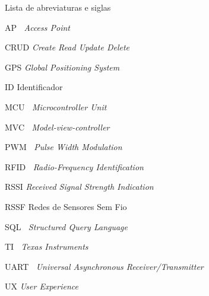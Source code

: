 \documentclass[]{politex}
\begin{document}
\capa
\falsafolhaderosto
\folhaderosto


\begin{folhadeaprovacao}
\end{folhadeaprovacao}














\listadefiguras
\listadetabelas

\begin{pretextualsection}{Lista de abreviaturas e siglas}

AP \quad \quad $\>$ \textit{Access Point}

CRUD \quad \textit{Create Read Update Delete}

GPS \quad \quad \textit{Global Positioning System}

ID \quad \quad \quad Identificador

MCU \quad $\>$ \textit{Microcontroller Unit}

MVC \quad $\>$ \textit{Model-view-controller}

PWM \quad $\>$ \textit{Pulse Width Modulation}

RFID \quad $\>$ \textit{Radio-Frequency Identification}

RSSI \quad \quad \textit{Received Signal Strength Indication}

RSSF \quad \quad Redes de Sensores Sem Fio

SQL \quad \quad $\>$ \textit{Structured Query Language}

TI \quad \quad \quad $\>$ \textit{Texas Instruments}

UART \quad $\>$ \textit{Universal Asynchronous Receiver/Transmitter}

UX \quad \quad \quad \textit{User Experience}

\end{pretextualsection}
\end{document}
